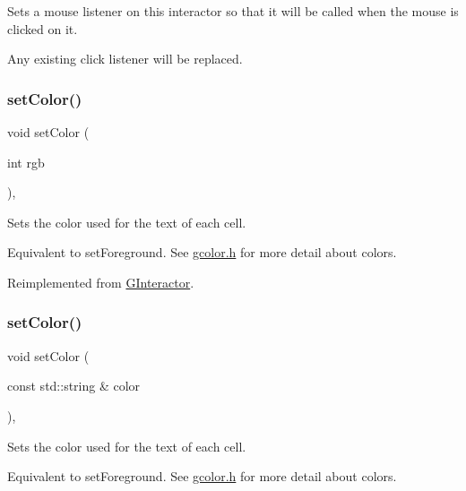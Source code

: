 Sets a mouse listener on this interactor so that it will be called when the mouse is clicked on it. 

Any existing click listener will be replaced. \mbox{\label{classGTable_a165735fb49fa7db12602d32557cbfe0d}} 
\subsubsection{\texorpdfstring{set\+Color()}{setColor()}\hspace{0.1cm}{\footnotesize\ttfamily [1/2]}}
{\footnotesize\ttfamily void set\+Color (\begin{DoxyParamCaption}\item[{int}]{rgb }\end{DoxyParamCaption})\hspace{0.3cm}{\ttfamily [override]}, {\ttfamily [virtual]}}



Sets the color used for the text of each cell. 

Equivalent to set\+Foreground. See \mbox{\hyperlink{gcolor_8h_source}{gcolor.\+h}} for more detail about colors. 

Reimplemented from \mbox{\hyperlink{classGInteractor_ab1f5cc0f5cc6bbbd716a526c61f1081d}{G\+Interactor}}.

\mbox{\label{classGTable_a56845b1accc47aa881d05939eef6996c}} 
\subsubsection{\texorpdfstring{set\+Color()}{setColor()}\hspace{0.1cm}{\footnotesize\ttfamily [2/2]}}
{\footnotesize\ttfamily void set\+Color (\begin{DoxyParamCaption}\item[{const std\+::string \&}]{color }\end{DoxyParamCaption})\hspace{0.3cm}{\ttfamily [override]}, {\ttfamily [virtual]}}



Sets the color used for the text of each cell. 

Equivalent to set\+Foreground. See \mbox{\hyperlink{gcolor_8h_source}{gcolor.\+h}} for more detail about colors. 


